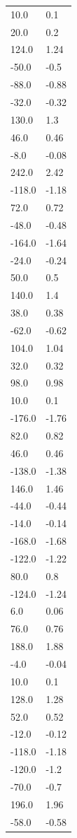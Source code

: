 \begin{longtable}{ll}
10.0 & 0.1 \\
20.0 & 0.2 \\
124.0 & 1.24 \\
-50.0 & -0.5 \\
-88.0 & -0.88 \\
-32.0 & -0.32 \\
130.0 & 1.3 \\
46.0 & 0.46 \\
-8.0 & -0.08 \\
242.0 & 2.42 \\
-118.0 & -1.18 \\
72.0 & 0.72 \\
-48.0 & -0.48 \\
-164.0 & -1.64 \\
-24.0 & -0.24 \\
50.0 & 0.5 \\
140.0 & 1.4 \\
38.0 & 0.38 \\
-62.0 & -0.62 \\
104.0 & 1.04 \\
32.0 & 0.32 \\
98.0 & 0.98 \\
10.0 & 0.1 \\
-176.0 & -1.76 \\
82.0 & 0.82 \\
46.0 & 0.46 \\
-138.0 & -1.38 \\
146.0 & 1.46 \\
-44.0 & -0.44 \\
-14.0 & -0.14 \\
-168.0 & -1.68 \\
-122.0 & -1.22 \\
80.0 & 0.8 \\
-124.0 & -1.24 \\
6.0 & 0.06 \\
76.0 & 0.76 \\
188.0 & 1.88 \\
-4.0 & -0.04 \\
10.0 & 0.1 \\
128.0 & 1.28 \\
52.0 & 0.52 \\
-12.0 & -0.12 \\
-118.0 & -1.18 \\
-120.0 & -1.2 \\
-70.0 & -0.7 \\
196.0 & 1.96 \\
-58.0 & -0.58 \\

\end{longtable}
